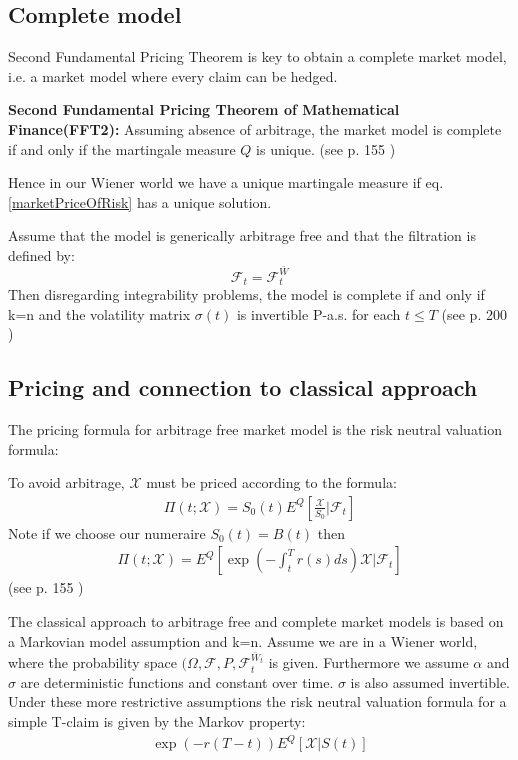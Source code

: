 \subsection{Complete model}
Second Fundamental Pricing Theorem is key to obtain a complete market model, i.e. a market model where every claim can be hedged.
\begin{theorem}\label{FFT2}
\textbf{Second Fundamental Pricing Theorem of Mathematical Finance(FFT2): } Assuming absence of arbitrage, the market model is complete if and only if the martingale measure $Q$ is unique.
(see p. 155 \parencite{finKont})
\end{theorem}
Hence in our Wiener world we have a unique martingale measure if eq. \ref{marketPriceOfRisk} has a unique solution. 

\begin{proposition}{}\label{completeProp}
Assume that the model is generically arbitrage free and that the filtration is defined by:
$$\mathcal{F}_t=\mathcal{F}_t^{\bar{W}}$$
Then disregarding integrability problems, the model is complete if and only if k=n and the volatility matrix $\sigma(t)$ is invertible P-a.s. for each $t \leq T$
(see p. 200 \parencite{finKont})
\end{proposition}


\subsection{Pricing and connection to classical approach}
The pricing formula for arbitrage free market model is the risk neutral valuation formula:
\begin{proposition}{}\label{RNVF}
To avoid arbitrage, $\mathcal{X}$ must be priced according to the formula:
\begin{align}
\Pi(t;\mathcal{X})=S_0(t)E^Q[\frac{\mathcal{X}}{S_0}|\mathcal{F}_t]
\end{align}
Note if we choose our numeraire $S_0(t)=B(t)$ then
\begin{align}
\Pi(t;\mathcal{X})=E^Q[\exp(-\int_t^T r(s) ds) \mathcal{X}|\mathcal{F}_t]
\end{align}
(see p. 155 \parencite{finKont})
\end{proposition}

The classical approach to arbitrage free and complete market models is based on a Markovian model assumption and k=n. Assume we are in a Wiener world, where the probability space $(\Omega, \mathcal{F}, P, \mathcal{F}_t^{\bar{W}_t}$ is given. Furthermore we assume $\alpha$ and $\sigma$ are deterministic functions and constant over time. $\sigma$ is also assumed invertible. Under these more restrictive assumptions the risk neutral valuation formula for a simple T-claim is given by the Markov property:
\begin{align}\label{MarkovRNVF}
\exp(-r(T-t))E^Q[\mathcal{X}|S(t)]
\end{align}

